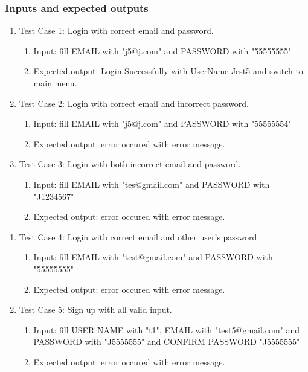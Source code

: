 \documentclass[11pt]{article}
\begin{document}
    \subsubsection*{Inputs and expected outputs}
    \begin{enumerate}
        \item Test Case 1: Login with correct email and password.
        \begin{enumerate}
            \item  Input: fill EMAIL with "j5@j.com" and PASSWORD with "55555555"
            \item  Expected output: Login Successfully with UserName Jest5 and switch to main menu.
        \end{enumerate}
        \item Test Case 2: Login with correct email and incorrect password.
        \begin{enumerate}
            \item  Input: fill EMAIL with "j5@j.com" and PASSWORD with "55555554"
            \item  Expected output: error occured with error message.
        \end{enumerate}
        \item Test Case 3: Login with both incorrect email and password.
        \begin{enumerate}
            \item  Input: fill EMAIL with "tes@gmail.com" and PASSWORD with "J1234567"
            \item Expected output: error occured with error message.
        \end{enumerate}
    \end{enumerate}
    \begin{enumerate}
        \item Test Case 4: Login with correct email and other user's password.
        \begin{enumerate}
            \item  Input: fill EMAIL with "test@gmail.com" and PASSWORD with "55555555"
            \item  Expected output: error occured with error message.
        \end{enumerate}
        \item Test Case 5: Sign up with all valid input.
        \begin{enumerate}
            \item  Input: fill USER NAME with "t1", EMAIL with "test5@gmail.com" and PASSWORD with "J5555555" and CONFIRM PASSWORD "J5555555"
            \item  Expected output: error occured with error message.
        \end{enumerate}
    \end{enumerate}
\end{document}
